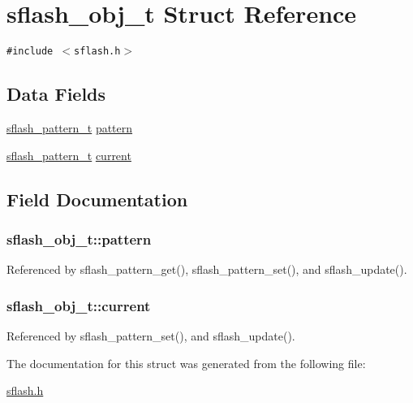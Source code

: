 \hypertarget{structsflash__obj__t}{
\section{sflash\_\-obj\_\-t Struct Reference}
\label{structsflash__obj__t}
}
{\tt \#include $<$sflash.h$>$}

\subsection*{Data Fields}
\begin{CompactItemize}
\item 
\hyperlink{sflash_8h_be66c5fe3d5d2392301219ae8ebbbcba}{sflash\_\-pattern\_\-t} \hyperlink{structsflash__obj__t_ba60ce52835a9586a201f19d87874c8f}{pattern}
\item 
\hyperlink{sflash_8h_be66c5fe3d5d2392301219ae8ebbbcba}{sflash\_\-pattern\_\-t} \hyperlink{structsflash__obj__t_f98c97cb42d8a019bad1f998315107ba}{current}
\end{CompactItemize}


\subsection{Field Documentation}
\hypertarget{structsflash__obj__t_ba60ce52835a9586a201f19d87874c8f}{
\subsubsection{ {\bf sflash\_\-obj\_\-t::pattern}}}
\label{structsflash__obj__t_ba60ce52835a9586a201f19d87874c8f}




Referenced by sflash\_\-pattern\_\-get(), sflash\_\-pattern\_\-set(), and sflash\_\-update().\hypertarget{structsflash__obj__t_f98c97cb42d8a019bad1f998315107ba}{
\subsubsection{ {\bf sflash\_\-obj\_\-t::current}}}
\label{structsflash__obj__t_f98c97cb42d8a019bad1f998315107ba}




Referenced by sflash\_\-pattern\_\-set(), and sflash\_\-update().

The documentation for this struct was generated from the following file:\begin{CompactItemize}
\item 
\hyperlink{sflash_8h}{sflash.h}\end{CompactItemize}
